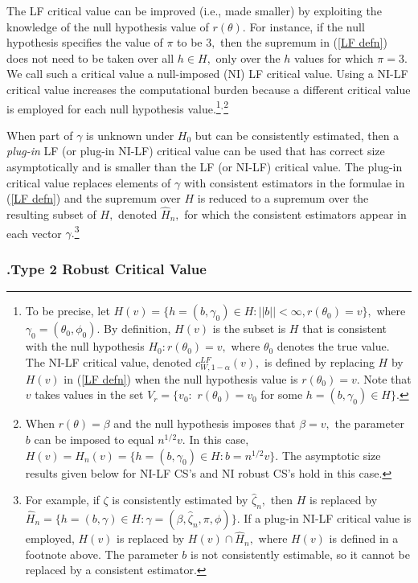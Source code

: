 \documentclass[12pt,thmsb,titlepage,final,oneside,letterpaper]{article}
\begin{document}
The LF critical value can be improved (i.e., made smaller) by exploiting the
knowledge of the null hypothesis value of $r(\theta ).$ For instance, if the
null hypothesis specifies the value of $\pi $ to be $3,$ then the supremum
in (\ref{LF defn}) does not need to be taken over all $h\in H,$ only over
the $h$ values for which $\pi =3.$ We call such a critical value a
null-imposed (NI) LF critical value. Using a NI-LF critical value increases
the computational burden because a different critical value is employed for
each null hypothesis value.\footnote{%
To be precise, let $H(v)=\{h=(b,\gamma _{0})\in H:||b||<\infty ,r(\theta
_{0})=v\},$ where $\gamma _{0}=(\theta _{0},\phi _{0}).$ By definition, $%
H(v) $ is the subset is $H$ that is consistent with the null hypothesis $%
H_{0}:r(\theta _{0})=v,$ where $\theta _{0}$ denotes the true value. The
NI-LF critical value, denoted $c_{W,1-\alpha }^{LF}(v),$ is defined by
replacing $H$ by $H(v)$ in (\ref{LF defn}) when the null hypothesis value is 
$r(\theta _{0})=v.$ Note that $v$ takes values in the set $V_{r}=\{v_{0}:$ $%
r(\theta _{0})=v_{0}$ for some $h=(b,\gamma _{0})\in H\}.$}$^{,}$\footnote{%
When $r(\theta )=\beta $ and the null hypothesis imposes that $\beta =v,$
the parameter $b$ can be imposed to equal $n^{1/2}v.$ In this case, $%
H(v)=H_{n}(v)=\{h=(b,\gamma _{0})\in H:b=n^{1/2}v\}.$ The asymptotic size
results given below for NI-LF CS's and NI robust CS's hold in this case.}

When part of $\gamma $ is unknown under $H_{0}$ but can be consistently
estimated, then a \emph{plug-in} LF (or plug-in NI-LF) critical value can be
used that has correct size asymptotically and is smaller than the LF (or
NI-LF) critical value. The plug-in critical value replaces elements of $%
\gamma $ with consistent estimators in the formulae in (\ref{LF defn}) and
the supremum over $H$ is reduced to a supremum over the resulting subset of $%
H,$ denoted $\widehat{H}_{n},$ for which the consistent estimators appear in
each vector $\gamma .$\footnote{%
For example, if $\zeta $ is consistently estimated by $\widehat{\zeta }_{n},$
then $H$ is replaced by $\widehat{H}_{n}=\{h=(b,\gamma )\in H:\gamma =(\beta
,\widehat{\zeta }_{n},\pi ,\phi )\}.$ If a plug-in NI-LF critical value is
employed, $H(v)$ is replaced by $H(v)\cap \widehat{H}_{n},$ where $H(v)$ is
defined in a footnote above. The parameter $b$ is not consistently
estimable, so it cannot be replaced by a consistent estimator.}

\subsubsection{\hspace{-0.19in}\textbf{.}\hspace{0.18in}Type 2 Robust
Critical Value\label{Type 2 robust CI Subsubsec}}
\end{document}
